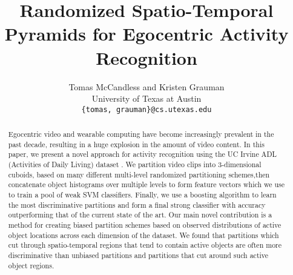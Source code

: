\documentclass[10pt,twocolumn,letterpaper]{article}
\begin{document}
\title{Randomized Spatio-Temporal Pyramids for Egocentric Activity Recognition}

\author{Tomas McCandless and Kristen Grauman\\
University of Texas at Austin\\
{\tt\small \{tomas, grauman\}@cs.utexas.edu}
}

\maketitle

\begin{abstract}
	Egocentric video and wearable computing have become increasingly
	prevalent in the past decade, resulting in a huge explosion in the amount
	of video content. In this paper, we present a novel approach for
	activity recognition using the UC Irvine ADL (Activities of Daily Living)
	dataset \cite{Ramanan12}.  We partition video clips into
	3-dimensional cuboids, based on many different multi-level randomized partitioning
	schemes,then concatenate object histograms
	over multiple levels to form feature vectors which we use to train a pool
	of weak SVM classifiers. 
	Finally, we use a boosting algorithm to learn the most discriminative
	partitions and form a
	final strong classifier with accuracy outperforming that of the current state of
	the art. Our main novel contribution is a method for
	creating biased partition schemes based on observed distributions of
	active object locations across each dimension of the dataset.
  We found that partitions which cut through spatio-temporal regions that
  tend to contain active objects are often more discriminative than
  unbiased partitions and 
  partitions that cut around such active object regions.
\end{abstract}

\end{document}
